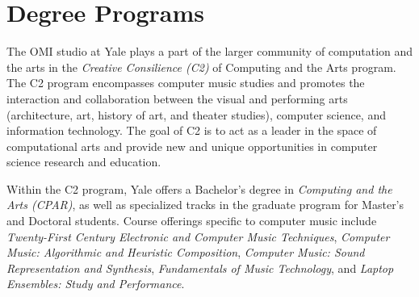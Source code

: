 \section{Degree Programs}

The OMI studio at Yale plays a part of the larger community of computation and the arts in the \textit{Creative Consilience (C2)} of Computing and the Arts program. The C2 program encompasses computer music studies and promotes the interaction and collaboration between the visual and performing arts (architecture, art, history of art, and theater studies), computer science, and information technology. The goal of C2 is to act as a leader in the space of computational arts and provide new and unique opportunities in computer science research and education.

Within the C2 program, Yale offers a Bachelor's degree in \textit{Computing and the Arts (CPAR)}, as well as specialized tracks in the graduate program for Master's and Doctoral students. Course offerings specific to computer music include \textit{Twenty-First Century Electronic and Computer Music Techniques}, \textit{Computer Music: Algorithmic and Heuristic Composition}, \textit{Computer Music: Sound Representation and Synthesis}, \textit{Fundamentals of Music Technology}, and \textit{Laptop Ensembles: Study and Performance}.

